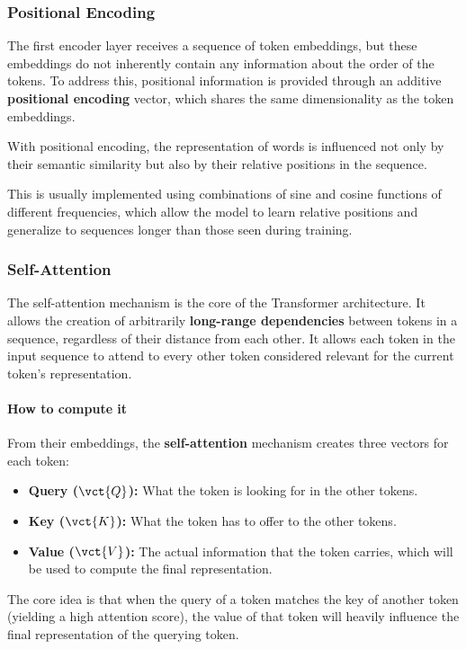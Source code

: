 \subsubsection{Positional Encoding}
The first encoder layer receives a sequence of token embeddings, but these embeddings do not inherently contain any information about the order of the tokens.
To address this, positional information is provided through an additive \textbf{positional encoding} vector, which shares the same dimensionality as the token embeddings. 

With positional encoding, the representation of words is influenced not only by their semantic similarity but also by their relative positions in the sequence.

This is usually implemented using combinations of sine and cosine functions of different frequencies, which allow the model to learn relative positions and generalize to sequences longer than those seen during training.

\subsubsection{Self-Attention}
The self-attention mechanism is the core of the Transformer architecture.
It allows the creation of arbitrarily \textbf{long-range dependencies} between tokens in a sequence, regardless of their distance from each other.
It allows each token in the input sequence to attend to every other token considered relevant for the current token's representation.

\paragraph{How to compute it}
From their embeddings, the \textbf{self-attention} mechanism creates three vectors for each token: 
\begin{itemize}
    \item \textbf{Query (\(\vct{Q}\)):} What the token is looking for in the other tokens.
    \item \textbf{Key (\(\vct{K}\)):} What the token has to offer to the other tokens.
    \item \textbf{Value (\(\vct{V}\)):} The actual information that the token carries, which will be used to compute the final representation.
\end{itemize}

The core idea is that when the query of a token matches the key of another token (yielding a high attention score), the value of that token will heavily influence the final representation of the querying token.

